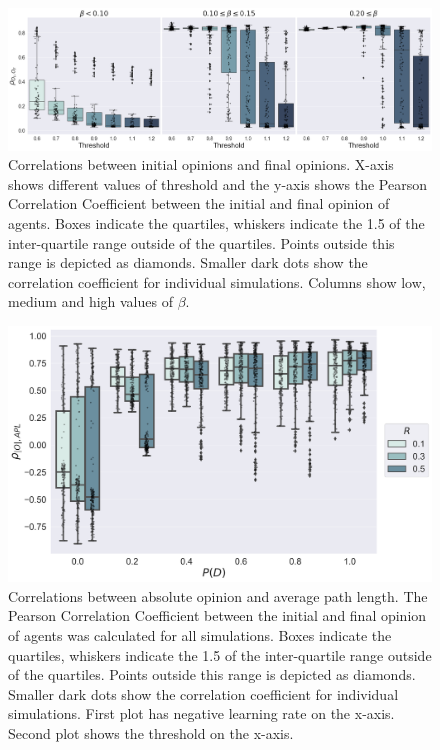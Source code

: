\documentclass{article}
\begin{document}
\begin{figure}[H]
    \centering
    \includegraphics[width=.8\linewidth]{../plots/overall/Correlation_Initial_Opinions.png}
  \caption{Correlations between initial opinions and final opinions. X-axis shows different values of threshold and the y-axis shows the Pearson Correlation Coefficient between the initial and final opinion of agents. Boxes indicate the quartiles, whiskers indicate the 1.5 of the inter-quartile range outside of the quartiles. Points outside this range is depicted as diamonds. Smaller dark dots show the correlation coefficient for individual simulations. Columns show low, medium and high values of $\beta$. }
  \label{fig:sfig1}
\end{figure}

\begin{figure}[H]
    \centering
    \includegraphics[width=.8\linewidth]{../plots/overall/Tie_Dissolution_Correlations_Boxplot_Full.png}
  \caption{Correlations between absolute opinion and average path length. The Pearson Correlation Coefficient between the initial and final opinion of agents was calculated for all simulations. Boxes indicate the quartiles, whiskers indicate the 1.5 of the inter-quartile range outside of the quartiles. Points outside this range is depicted as diamonds. Smaller dark dots show the correlation coefficient for individual simulations. First plot has negative learning rate on the x-axis. Second plot shows the threshold on the x-axis. }
  \label{fig:sfig1}
\end{figure}
\end{document}
